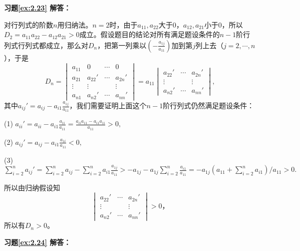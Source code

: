 \documentclass[a4paper]{book}
\newcommand{\enum}{\begin{list}{}{\setlength{\leftmargin}{0pt} \setlength{\itemindent}{2.5em} \setlength{\listparindent}{2em}}}
\begin{document}
\vspace{1.5em}

\textbf{习题\ref{ex:2.23} 解答：}

对行列式的阶数$n$用归纳法。$n=2$时，由于$a_{11},a_{22}$大于0，$a_{12},a_{21}$小于0，所以$D_2 = a_{11}a_{22} - a_{12}a_{21} > 0$成立。假设题目的结论对所有满足题设条件的$n-1$阶行列式行列式都成立，那么对$D_n$，把第一列乘以$(-\frac{a_{1j}}{a_{11}})$加到第$j$列上去（$j=2,\cdots,n$），于是
$$D_n = \begin{vmatrix} a_{11} & 0 & \cdots & 0 \\ a_{21} & a_{22}' & \cdots & a_{2n}' \\ \vdots & \vdots & & \vdots \\ a_{n1} & a_{n2}' & \cdots & a_{nn}' \end{vmatrix} = a_{11} \begin{vmatrix}  a_{22}' & \cdots & a_{2n}' \\ \vdots & & \vdots \\ a_{n2}' & \cdots & a_{nn}' \end{vmatrix},$$
其中$a_{ij}' = a_{ij} - a_{i1}\frac{a_{1j}}{a_{11}}$，我们需要证明上面这个$n-1$阶行列式仍然满足题设条件：
\enum
\item[(1)] $a_{ii}' = a_{ii} - a_{i1}\frac{a_{1i}}{a_{11}} = \frac{a_{ii}a_{11} - a_{i1}a_{1i}}{a_{11}} > 0,$
\item[(2)] $a_{ij}' = a_{ij} - a_{i1}\frac{a_{1i}}{a_{11}} < 0,$
\item[(3)] $\sum\limits_{i=2}^n a_{ij}' = \sum\limits_{i=2}^n a_{ij} - \sum\limits_{i=2}^n a_{i1}\frac{a_{1j}}{a_{11}} > -a_{1j} - a_{1j}\sum\limits_{i=2}^n \frac{a_{i1}}{a_{11}} = -a_{1j}(a_{11} + \sum\limits_{i=2}^n a_{i1}) / a_{11} > 0.$
\end{list}
所以由归纳假设知
$$\begin{vmatrix}  a_{22}' & \cdots & a_{2n}' \\ \vdots & & \vdots \\ a_{n2}' & \cdots & a_{nn}' \end{vmatrix} > 0，$$
所以有$D_n > 0$。

\vspace{1.5em}

\textbf{习题\ref{ex:2.24} 解答：}
\end{document}
